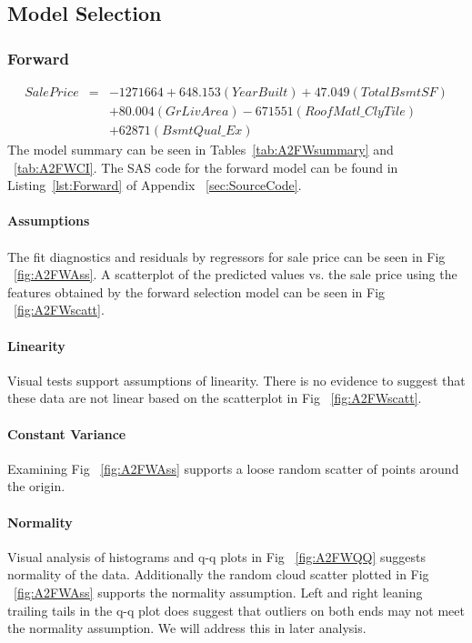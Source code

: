 \documentclass[11pt]{scrartcl} %
\begin{document}
\subsection{Model Selection}
\subsubsection{Forward}
\begin{eqnarray*}
SalePrice &=& -1271664 + 648.153(YearBuilt) + 47.049(TotalBsmtSF) \\
& & + 80.004(GrLivArea) - 671551(RoofMatl\_ClyTile)\\
& & + 62871(BsmtQual\_Ex)
\end{eqnarray*}
The model summary can be seen in Tables~\ref{tab:A2FWsummary} and ~\ref{tab:A2FWCI}.  The SAS code for the forward model can be found in Listing~\ref{lst:Forward} of Appendix ~\ref{sec:SourceCode}. 
\paragraph{Assumptions}
\paragraph{}The fit diagnostics and residuals by regressors for sale price can be seen in Fig ~\ref{fig:A2FWAss}. A scatterplot of the predicted values vs. the sale price using the features obtained by the forward selection model can be seen in Fig ~\ref{fig:A2FWscatt}.
\paragraph{Linearity} Visual tests support assumptions of linearity. There is no evidence to suggest that these data are not linear based on the scatterplot in Fig ~\ref{fig:A2FWscatt}.
\paragraph{Constant Variance} Examining Fig ~\ref{fig:A2FWAss} supports a loose random scatter of points around the origin. 
\paragraph{Normality} Visual analysis of histograms and q-q plots in Fig ~\ref{fig:A2FWQQ} suggests normality of the data. Additionally the random cloud scatter plotted in Fig ~\ref{fig:A2FWAss} supports the normality assumption. Left and right leaning trailing tails in the q-q plot does suggest that outliers on both ends may not meet the normality assumption. We will address this in later analysis.
\end{document}
